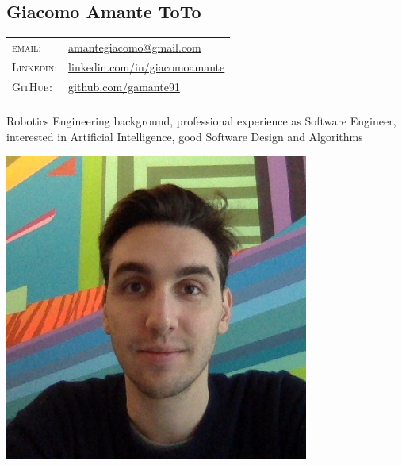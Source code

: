 \documentclass[a4paper,10pt]{article}
\begin{document}
	
	\pagestyle{empty}

	\begin{minipage}{0.75\textwidth}
		\vspace{-10mm}
		\begin{flushleft}
			\section{\Huge Giacomo Amante ToTo}
			\vspace{2mm}
			\begin{tabular}{ll}
				\textsc{email:} & \href{mailto:amantegiacomo@gmail.com}{amantegiacomo@gmail.com} \\
				\textsc{Linkedin:} & 
				\href{http://www.linkedin.com/in/giacomoamante}{\color{black}linkedin.com/in/giacomoamante}\\
				\textsc{GitHub:} & \href{https://github.com/gamante91}{github.com/gamante91}\\
				\multicolumn{2}{c}{} \\
			\end{tabular}
		\end{flushleft}
	Robotics Engineering background, professional experience as Software Engineer,\\
	interested in Artificial Intelligence, good Software Design and Algorithms\\
	\end{minipage}
	\begin{minipage}[c]{0.25\textwidth}
		\begin{center}
			\includegraphics[width=0.75\textwidth]{GiacomoAmante_lowres}
		\end{center}
	\end{minipage}
\end{document}
